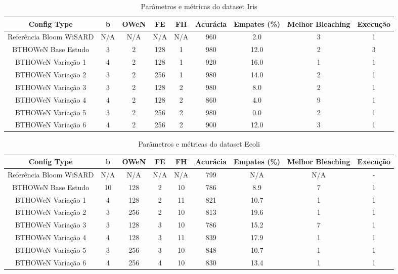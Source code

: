 \documentclass{article}
\begin{document}
{\small
\begin{longtable}{|c|c|c|c|c|c|c|c|c|}
\caption{Parâmetros e métricas do dataset Iris} \\
\hline
\textbf{Config Type} & \textbf{b} & \textbf{OWeN} & \textbf{FE} & \textbf{FH} & \textbf{Acurácia} & \textbf{Empates (\%)} & \textbf{Melhor Bleaching} & \textbf{Execução} \\
\hline
Referência Bloom WiSARD & N/A & N/A & N/A & N/A & 960 & 2.0 & 3 & 1 \\
\hline
BTHOWeN Base Estudo & 3 & 2 & 128 & 1 & 980 & 12.0 & 2 & 3 \\
\hline
BTHOWeN Variação 1 & 4 & 2 & 128 & 1 & 920 & 16.0 & 1 & 1 \\
\hline
BTHOWeN Variação 2 & 3 & 2 & 256 & 1 & 980 & 14.0 & 2 & 1 \\
\hline
BTHOWeN Variação 3 & 3 & 2 & 128 & 2 & 980 & 8.0 & 2 & 1 \\
\hline
BTHOWeN Variação 4 & 4 & 2 & 128 & 2 & 860 & 4.0 & 9 & 1 \\
\hline
BTHOWeN Variação 5 & 3 & 2 & 256 & 2 & 980 & 0.0 & 2 & 1 \\
\hline
BTHOWeN Variação 6 & 4 & 2 & 256 & 2 & 900 & 12.0 & 3 & 1 \\
\hline
\end{longtable}

\begin{longtable}{|c|c|c|c|c|c|c|c|c|}
\caption{Parâmetros e métricas do dataset Ecoli} \\
\hline
\textbf{Config Type} & \textbf{b} & \textbf{OWeN} & \textbf{FE} & \textbf{FH} & \textbf{Acurácia} & \textbf{Empates (\%)} & \textbf{Melhor Bleaching} & \textbf{Execução} \\
\hline
Referência Bloom WiSARD & N/A & N/A & N/A & N/A & 799 & N/A & N/A & - \\
\hline
BTHOWeN Base Estudo & 10 & 128 & 2 & 10 & 786 & 8.9 & 7 & 1 \\
\hline
BTHOWeN Variação 1 & 4 & 128 & 2 & 11 & 821 & 10.7 & 1 & 1 \\
\hline
BTHOWeN Variação 2 & 3 & 256 & 2 & 10 & 813 & 19.6 & 1 & 1 \\
\hline
BTHOWeN Variação 3 & 3 & 128 & 3 & 10 & 786 & 15.2 & 7 & 1 \\
\hline
BTHOWeN Variação 4 & 4 & 128 & 3 & 11 & 839 & 17.9 & 1 & 1 \\
\hline
BTHOWeN Variação 5 & 3 & 256 & 3 & 10 & 848 & 10.7 & 1 & 1 \\
\hline
BTHOWeN Variação 6 & 4 & 256 & 4 & 10 & 830 & 13.4 & 1 & 1 \\
\hline
\end{longtable}

}
\end{document}
